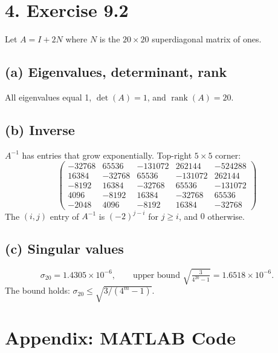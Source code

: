 \documentclass[11pt]{article}
\begin{document}
\section*{4. Exercise 9.2}

Let $A=I+2N$ where $N$ is the $20\times20$ superdiagonal matrix of ones.

\subsection*{(a) Eigenvalues, determinant, rank}

All eigenvalues equal 1, $\det(A)=1$, and $\operatorname{rank}(A)=20$.

\subsection*{(b) Inverse}

$A^{-1}$ has entries that grow exponentially. Top-right $5\times5$ corner:
\[
\begin{pmatrix}
-32768 & 65536 & -131072 & 262144 & -524288\\
16384 & -32768 & 65536 & -131072 & 262144\\
-8192 & 16384 & -32768 & 65536 & -131072\\
4096 & -8192 & 16384 & -32768 & 65536\\
-2048 & 4096 & -8192 & 16384 & -32768
\end{pmatrix}
\]
The $(i,j)$ entry of $A^{-1}$ is $(-2)^{j-i}$ for $j\ge i$, and $0$ otherwise.

\subsection*{(c) Singular values}

\[
\sigma_{20} = 1.4305\times10^{-6},\qquad
\text{upper bound } \sqrt{\tfrac{3}{4^{20}-1}} = 1.6518\times10^{-6}.
\]
The bound holds: $\sigma_{20}\le\sqrt{3/(4^m-1)}$.

\newpage
\section*{Appendix: MATLAB Code}


\end{document}
